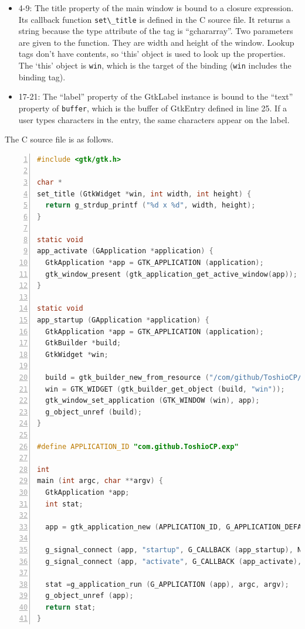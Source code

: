 \begin{itemize}
\tightlist
\item
  4-9: The title property of the main window is bound to a closure
  expression. Its callback function \passthrough{\lstinline!set\_title!}
  is defined in the C source file. It returns a string because the type
  attribute of the tag is ``gchararray''. Two parameters are given to
  the function. They are width and height of the window. Lookup tags
  don't have contents, so `this' object is used to look up the
  properties. The `this' object is \passthrough{\lstinline!win!}, which
  is the target of the binding (\passthrough{\lstinline!win!} includes
  the binding tag).
\item
  17-21: The ``label'' property of the GtkLabel instance is bound to the
  ``text'' property of \passthrough{\lstinline!buffer!}, which is the
  buffer of GtkEntry defined in line 25. If a user types characters in
  the entry, the same characters appear on the label.
\end{itemize}

The C source file is as follows.

\begin{lstlisting}[language=C, numbers=left]
#include <gtk/gtk.h>

char *
set_title (GtkWidget *win, int width, int height) {
  return g_strdup_printf ("%d x %d", width, height);
}

static void
app_activate (GApplication *application) {
  GtkApplication *app = GTK_APPLICATION (application);
  gtk_window_present (gtk_application_get_active_window(app));
}

static void
app_startup (GApplication *application) {
  GtkApplication *app = GTK_APPLICATION (application);
  GtkBuilder *build;
  GtkWidget *win;

  build = gtk_builder_new_from_resource ("/com/github/ToshioCP/exp/exp.ui");
  win = GTK_WIDGET (gtk_builder_get_object (build, "win"));
  gtk_window_set_application (GTK_WINDOW (win), app);
  g_object_unref (build);
}

#define APPLICATION_ID "com.github.ToshioCP.exp"

int
main (int argc, char **argv) {
  GtkApplication *app;
  int stat;

  app = gtk_application_new (APPLICATION_ID, G_APPLICATION_DEFAULT_FLAGS);

  g_signal_connect (app, "startup", G_CALLBACK (app_startup), NULL);
  g_signal_connect (app, "activate", G_CALLBACK (app_activate), NULL);

  stat =g_application_run (G_APPLICATION (app), argc, argv);
  g_object_unref (app);
  return stat;
}
\end{lstlisting}

